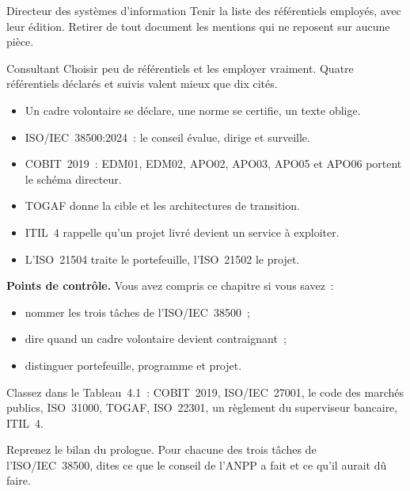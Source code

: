 \begin{boxmetier}{Directeur des systèmes d'information}
Tenir la liste des référentiels employés, avec leur édition. Retirer de tout document les mentions qui ne reposent sur aucune pièce.
\end{boxmetier}

\begin{boxmetier}{Consultant}
Choisir peu de référentiels et les employer vraiment. Quatre référentiels déclarés et suivis valent mieux que dix cités.
\end{boxmetier}

\begin{boxresume}
\begin{itemize}
    \item Un cadre volontaire se déclare, une norme se certifie, un texte oblige.
    \item ISO/IEC~38500:2024~: le conseil évalue, dirige et surveille.
    \item COBIT~2019~: EDM01, EDM02, APO02, APO03, APO05 et APO06 portent le schéma directeur.
    \item TOGAF donne la cible et les architectures de transition.
    \item ITIL~4 rappelle qu'un projet livré devient un service à exploiter.
    \item L'ISO~21504 traite le portefeuille, l'ISO~21502 le projet.
\end{itemize}
\end{boxresume}

\begin{boxinfo}
\textbf{Points de contrôle.} Vous avez compris ce chapitre si vous savez~:
\begin{itemize}
    \item nommer les trois tâches de l'ISO/IEC~38500~;
    \item dire quand un cadre volontaire devient contraignant~;
    \item distinguer portefeuille, programme et projet.
\end{itemize}
\end{boxinfo}

\begin{boxexo}[title={\ding{45}\quad Exercice~4.1. Quelle nature \niveaubase}]
Classez dans le Tableau~4.1~: COBIT~2019, ISO/IEC~27001, le code des marchés publics, ISO~31000, TOGAF, ISO~22301, un règlement du superviseur bancaire, ITIL~4.
\end{boxexo}

\begin{boxexo}[title={\ding{45}\quad Exercice~4.2. Trois tâches \niveaumoyen}]
Reprenez le bilan du prologue. Pour chacune des trois tâches de l'ISO/IEC~38500, dites ce que le conseil de l'ANPP a fait et ce qu'il aurait dû faire.
\end{boxexo}

